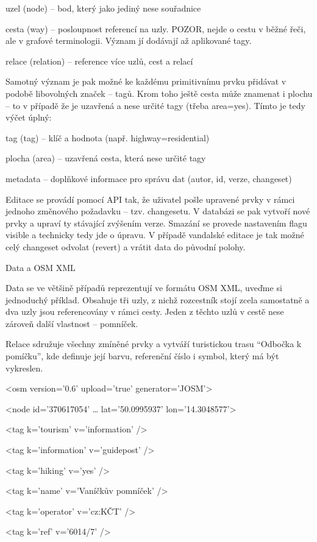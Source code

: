 uzel (node) – bod, který jako jediný nese souřadnice

cesta (way) – posloupnost referencí na uzly. POZOR, nejde o cestu v běžné řeči, ale v grafové terminologii. Význam jí dodávají až aplikované tagy.  

relace (relation) – reference více uzlů, cest a relací

Samotný význam je pak možné ke každému primitivnímu prvku přidávat v podobě libovolných značek – tagů. Krom toho ještě cesta může znamenat i plochu – to v případě že je uzavřená a nese určité tagy (třeba area=yes). Tímto je tedy výčet úplný:

tag (tag) – klíč a hodnota (např. highway=residential)        

plocha (area) – uzavřená cesta, která nese určité tagy

metadata – doplňkové informace pro správu dat (autor, id, verze, changeset)

Editace se provádí pomocí API tak, že uživatel pošle upravené prvky v rámci jednoho změnového požadavku – tzv. changesetu. V databázi se pak vytvoří nové prvky a upraví ty stávající zvýšením verze. Smazání se provede nastavením flagu visible a technicky tedy jde o úpravu. V případě vandalské editace je tak možné celý changeset odvolat (revert) a vrátit data do původní polohy.

Data a OSM XML



Data se ve většině případů reprezentují ve formátu OSM XML, uveďme si jednoduchý příklad. Obsahuje tři uzly, z nichž rozcestník stojí zcela samostatně a dva uzly jsou referencovány v rámci cesty. Jeden z těchto uzlů v cestě nese zároveň další vlastnost – pomníček.

Relace sdružuje všechny zmíněné prvky a vytváří turistickou trasu “Odbočka k pomíčku”, kde definuje její barvu, referenční číslo i symbol, který má být vykreslen.

<osm version='0.6' upload='true' generator='JOSM'>

 <node id='370617054' … lat='50.0995937' lon='14.3048577'>

   <tag k='tourism' v='information' />

   <tag k='information' v='guidepost' />

   <tag k='hiking' v='yes' />

   <tag k='name' v='Vaníčkův pomníček' />

   <tag k='operator' v='cz:KČT' />

   <tag k='ref' v='6014/7' />

